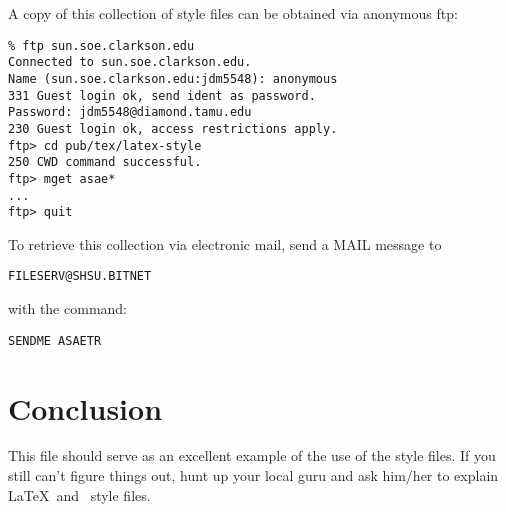 A copy of this collection of style files can be obtained via
anonymous ftp:
\small \begin{verbatim}
% ftp sun.soe.clarkson.edu
Connected to sun.soe.clarkson.edu.
Name (sun.soe.clarkson.edu:jdm5548): anonymous
331 Guest login ok, send ident as password.
Password: jdm5548@diamond.tamu.edu
230 Guest login ok, access restrictions apply.
ftp> cd pub/tex/latex-style
250 CWD command successful.
ftp> mget asae*
...
ftp> quit
\end{verbatim}\normalsize
\noindent
To retrieve this collection via electronic mail, send a MAIL message to

\centerline{\tt FILESERV@SHSU.BITNET}
\noindent with the command:

\centerline{\tt SENDME ASAETR}

\section{Conclusion}

This file should serve as an excellent example of the use of the style
files.  If you still can't figure things out, hunt up your local guru
and ask him/her to explain \LaTeX\ and \BibTeX\ style files.



